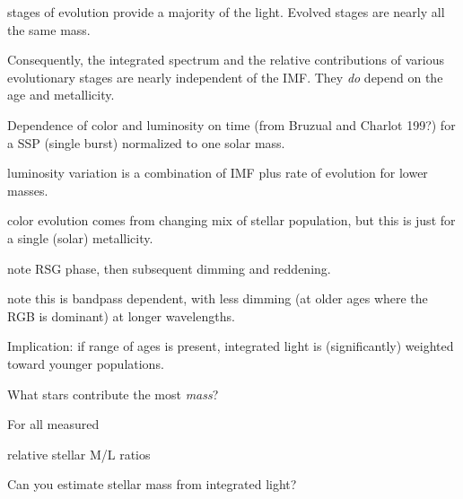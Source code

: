 \documentclass[12pt]{article}
\begin{document}
\begin{itemize*}
\begin{itemize*}
\begin{itemize*}
                            stages of evolution provide a majority of the light.
                            Evolved stages are nearly all the same mass.
                        \item Consequently, the integrated spectrum and the
                            relative contributions of various evolutionary
                            stages are nearly independent of the IMF\@. They
                            \emph{do} depend on the age and metallicity.
                    \end{itemize*}
                \item Dependence of color and luminosity on time (from
                    Bruzual and Charlot 199?) for a SSP (single burst)
                    normalized to one solar mass.
                    \begin{itemize*}
                        \item luminosity variation is a combination of IMF plus
                            rate of evolution for lower masses.
                        \item color evolution comes from changing mix of stellar
                            population, but this is just for a single (solar)
                            metallicity.
                        \item note RSG phase, then subsequent dimming and
                            reddening.
                        \item note this is bandpass dependent, with less dimming
                            (at older ages where the RGB is dominant) at longer
                            wavelengths.
                    \end{itemize*}
                \item Implication: if range of ages is present, integrated light
                    is (significantly) weighted toward younger populations.
            \end{itemize*}
        \item What stars contribute the most \emph{mass}?
            \begin{itemize*}
                \item For all measured
                \item relative stellar M/L ratios
            \end{itemize*}
        \item Can you estimate stellar mass from integrated light?

\end{itemize*}
\end{document}
